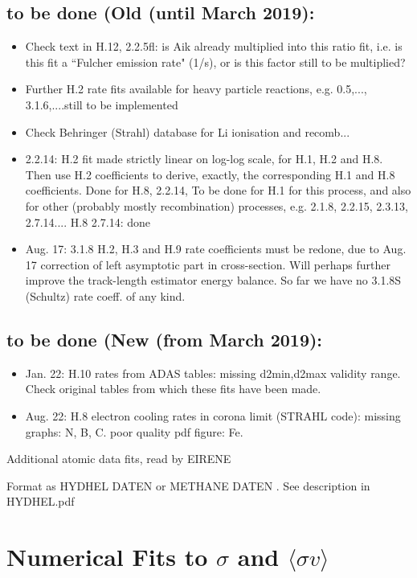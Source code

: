 \documentclass[12pt,dvipdfmx]{article}
\begin{document}
\subsection{to be done (Old (until March 2019):}
\begin{itemize}
\item  Check text in H.12, 2.2.5fl:  is Aik already multiplied into this ratio fit, i.e. is
this fit a ``Fulcher emission rate" (1/s), or is this factor still to be multiplied?
\item  Further H.2 rate fits available for heavy particle reactions, e.g. 0.5,..., 3.1.6,....still to be implemented
\item  Check Behringer (Strahl) database for Li ionisation and recomb...
\item 2.2.14: H.2 fit made strictly linear on log-log scale, for H.1, H.2 and H.8. Then use H.2 coefficients to
derive, exactly, the corresponding H.1 and H.8 coefficients. Done for H.8, 2.2.14,  To be done for H.1 for this
process,
and also for other (probably mostly recombination) processes, e.g. 2.1.8, 2.2.15, 2.3.13, 2.7.14....
H.8 2.7.14: done
\item  Aug. 17:   3.1.8  H.2, H.3 and H.9 rate coefficients must be redone, due to Aug. 17 correction of left asymptotic part in cross-section.
Will perhaps further improve the track-length estimator energy balance.
So far we have no 3.1.8S (Schultz) rate coeff. of any kind.
\end{itemize}

\subsection{to be done (New (from March 2019):}
\begin{itemize}
\item Jan. 22: H.10 rates from ADAS tables: missing d2min,d2max
validity range. Check original tables from which these fits have been made.
\item Aug. 22: H.8 electron cooling rates in corona limit (STRAHL code): 
missing graphs: N, B, C.
poor quality pdf figure: Fe.
\end{itemize}

\newpage
Additional atomic data fits, read by EIRENE

Format as HYDHEL DATEN \cite{kn:Janev}
or METHANE DATEN \cite{kn:Ehrhardt}. See description in HYDHEL.pdf
\newpage
\section{Numerical Fits to $\sigma$ and $\langle\sigma v\rangle$}\label{sec1}
\end{document}
